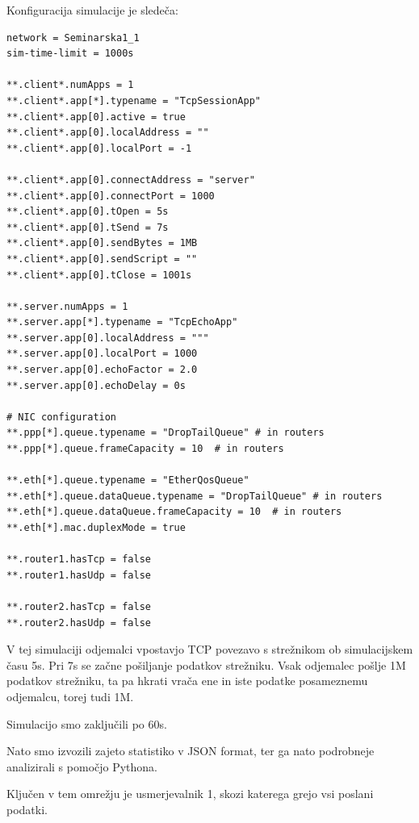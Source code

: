 \documentclass[11pt,a4paper,slovene]{myarticle}
\begin{document}
Konfiguracija simulacije je sledeča:

\begin{lstlisting}
network = Seminarska1_1
sim-time-limit = 1000s

**.client*.numApps = 1
**.client*.app[*].typename = "TcpSessionApp"
**.client*.app[0].active = true
**.client*.app[0].localAddress = ""
**.client*.app[0].localPort = -1

**.client*.app[0].connectAddress = "server"
**.client*.app[0].connectPort = 1000
**.client*.app[0].tOpen = 5s
**.client*.app[0].tSend = 7s
**.client*.app[0].sendBytes = 1MB
**.client*.app[0].sendScript = ""
**.client*.app[0].tClose = 1001s

**.server.numApps = 1
**.server.app[*].typename = "TcpEchoApp"
**.server.app[0].localAddress = """
**.server.app[0].localPort = 1000
**.server.app[0].echoFactor = 2.0
**.server.app[0].echoDelay = 0s

# NIC configuration
**.ppp[*].queue.typename = "DropTailQueue" # in routers
**.ppp[*].queue.frameCapacity = 10  # in routers

**.eth[*].queue.typename = "EtherQosQueue"
**.eth[*].queue.dataQueue.typename = "DropTailQueue" # in routers
**.eth[*].queue.dataQueue.frameCapacity = 10  # in routers
**.eth[*].mac.duplexMode = true

**.router1.hasTcp = false
**.router1.hasUdp = false

**.router2.hasTcp = false
**.router2.hasUdp = false
\end{lstlisting}

V tej simulaciji odjemalci vpostavjo TCP povezavo s strežnikom ob simulacijskem času 5s. Pri 7s se začne pošiljanje podatkov strežniku. Vsak odjemalec pošlje 1M podatkov strežniku, ta pa hkrati vrača ene in iste podatke posameznemu odjemalcu, torej tudi 1M.

Simulacijo smo zaključili po 60s.

Nato smo izvozili zajeto statistiko v JSON format, ter ga nato podrobneje analizirali s pomočjo Pythona.

Ključen v tem omrežju je usmerjevalnik 1, skozi katerega grejo vsi poslani podatki.
\end{document}
